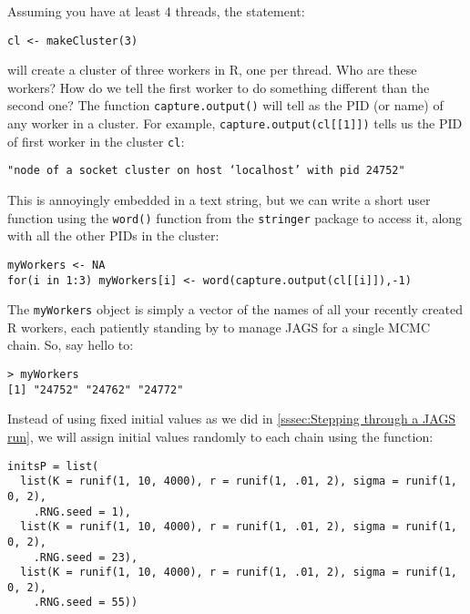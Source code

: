 \documentclass[12pt,english]{article}
\begin{document}
Assuming you have at least 4 threads, the statement:

\begin{Verbatim}
cl <- makeCluster(3)
\end{Verbatim}

\noindent will create a cluster of three workers in R, one per thread. Who are these workers? How do we tell the first worker to do something different than the second one? The function \texttt{capture.output()} will tell as the PID (or name) of any worker in a cluster. For example, \texttt{capture.output(cl[[1]])} tells us the PID of first worker in the cluster \texttt{cl}:

\begin{Verbatim}[fontsize=\small]
"node of a socket cluster on host ‘localhost’ with pid 24752"
\end{Verbatim}

\noindent This is annoyingly embedded in a text string, but we can write a short user function using the \texttt{word()} function from the \texttt{stringer} package to access it, along with all the other PIDs in the cluster:

\begin{Verbatim}
myWorkers <- NA
for(i in 1:3) myWorkers[i] <- word(capture.output(cl[[i]]),-1)
\end{Verbatim}

\noindent The \texttt{myWorkers} object is simply a vector of the names of all your recently created R workers, each patiently standing by to manage JAGS for a single MCMC chain. So, say hello to:

\begin{Verbatim}[fontsize=\small]
> myWorkers
[1] "24752" "24762" "24772"
\end{Verbatim}

Instead of using fixed initial values as we did in \ref{sssec:Stepping through a JAGS run}, we will assign initial values randomly to each chain using the function:

\begin{Verbatim}
initsP = list(
  list(K = runif(1, 10, 4000), r = runif(1, .01, 2), sigma = runif(1, 0, 2),
    .RNG.seed = 1),
  list(K = runif(1, 10, 4000), r = runif(1, .01, 2), sigma = runif(1, 0, 2), 
    .RNG.seed = 23),
  list(K = runif(1, 10, 4000), r = runif(1, .01, 2), sigma = runif(1, 0, 2), 
    .RNG.seed = 55))
\end{Verbatim}
\end{document}

